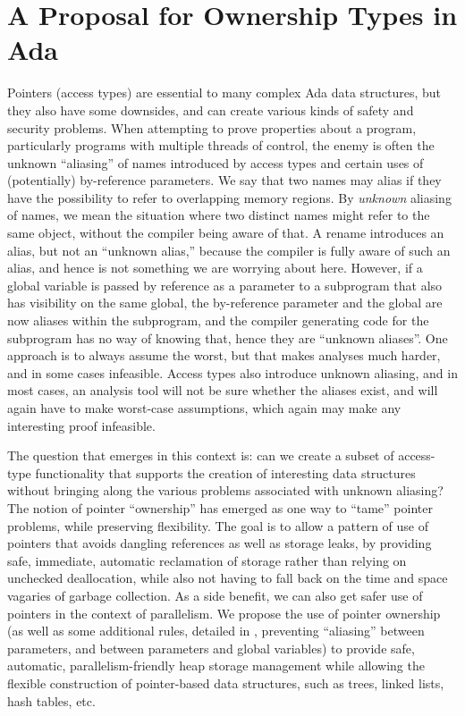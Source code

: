 \documentclass{llncs}
\begin{document}
\section{A Proposal for Ownership Types in Ada}
Pointers (access types) are essential to many complex Ada data structures, but they also have some downsides, and can create various kinds of safety and security problems.
When attempting to prove properties about a program, particularly programs with multiple threads of control, the enemy is often the unknown ``aliasing'' of names introduced by
access types and certain uses of (potentially) by-reference parameters. We say that two names may alias if they have the possibility to refer to overlapping memory regions.
By \textit{unknown} aliasing of names, we mean the situation where two distinct names might refer to the same object, without the compiler being aware of that.  A rename introduces
an alias, but not an ``unknown alias,'' because the compiler is fully aware of such an alias, and hence is not something we are worrying about here. However, if a global
variable is passed by reference as a parameter to a subprogram that also has visibility on the same global, the by-reference parameter and the global are now aliases within
the subprogram, and the compiler generating code for the subprogram has no way of knowing that, hence they are ``unknown aliases''.  One approach is to always assume the worst,
but that makes analyses much harder, and in some cases infeasible. Access types also introduce unknown aliasing, and in most cases, an analysis tool will not be
sure whether the aliases exist, and will again have to make worst-case assumptions, which again may make any interesting proof infeasible.

\smallskip
The question that emerges in this context is: can we create a subset of access-type functionality that supports the creation of interesting data structures without bringing along
the various problems associated with unknown aliasing? The notion of pointer ``ownership'' has emerged as one way to ``tame'' pointer problems, while preserving flexibility.  The goal is to allow a pattern of use
of pointers that avoids dangling references as well as storage leaks, by providing safe, immediate, automatic reclamation of storage rather than relying on unchecked deallocation,
while also not having to fall back on the time and space vagaries of garbage collection.  As a side benefit, we can also get safer use of pointers in the context of parallelism.
We propose the use of pointer ownership (as well as some additional rules, detailed in \cite{AI2018}, preventing ``aliasing'' between parameters, and between parameters and global variables) to provide safe,
automatic, parallelism-friendly heap storage management while allowing the flexible construction of pointer-based data structures, such as trees, linked lists, hash tables, etc.
\end{document}
